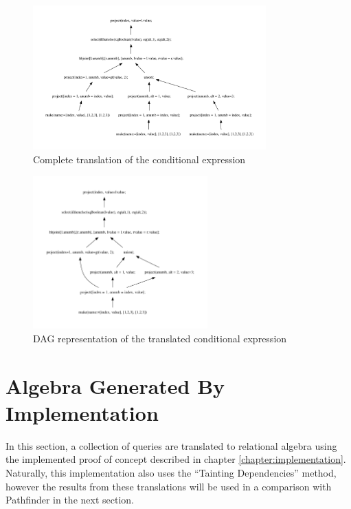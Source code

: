 \begin{figure}[!htp]
\centering
  \includegraphics[width=0.8\textwidth]{img/graphs/ifthenelse}
  \caption{Complete translation of the conditional expression }
  \label{fig:results:query_ifthenelse_result}
\end{figure}


\begin{figure}[!htp]
\centering
  \includegraphics[width=0.6\textwidth]{img/graphs/ifthenelse_dag}
  \caption{DAG representation of the translated conditional expression}
  \label{fig:results:query_ifthenelse_result_dag}
\end{figure}

\newpage

\section{Algebra Generated By Implementation}
\label{sect:result:implementation_algebra}
In this section, a collection of queries are translated to relational
algebra using the implemented proof of concept described in chapter
\ref{chapter:implementation}. Naturally, this implementation also uses the
``Tainting Dependencies'' method, however the results from these translations
will be used in a comparison with Pathfinder in the next section.

